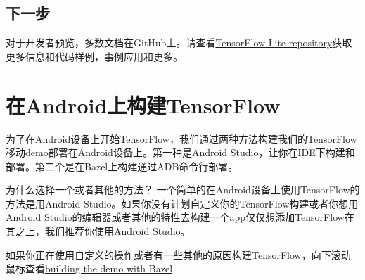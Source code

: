 \subsection{下一步}
对于开发者预览，多数文档在GitHub上。请查看\href{https://github.com/tensorflow/tensorflow/tree/master/tensorflow/contrib/lite}{TensorFlow Lite repository}获取更多信息和代码样例，事例应用和更多。

\section{在Android上构建TensorFlow}
为了在Android设备上开始TensorFlow，我们通过两种方法构建我们的TensorFlow移动demo部署在Android设备上。第一种是Android Studio，让你在IDE下构建和部署。第二个是在Bazel上构建通过ADB命令行部署。

为什么选择一个或者其他的方法？
一个简单的在Android设备上使用TensorFlow的方法是用Android Studio。如果你没有计划自定义你的TensorFlow构建或者你想用Android Studio的编辑器或者其他的特性去构建一个app仅仅想添加TensorFlow在其之上，我们推荐你使用Android Studio。

如果你正在使用自定义的操作或者有一些其他的原因构建TensorFlow，向下滚动鼠标查看\href{https://www.tensorflow.org/mobile/android_build?hl=zh-cn#build_the_demo_using_bazel} {building the demo with Bazel}
